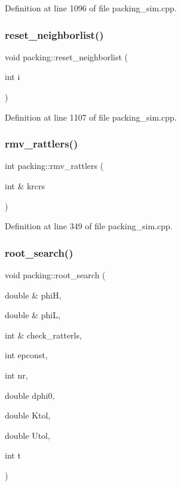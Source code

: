 Definition at line 1096 of file packing\+\_\+sim.\+cpp.

\mbox{\label{classpacking_a9c073e15bbafc308692fb63f6390a843}} 
\subsubsection{\texorpdfstring{reset\+\_\+neighborlist()}{reset\_neighborlist()}}
{\footnotesize\ttfamily void packing\+::reset\+\_\+neighborlist (\begin{DoxyParamCaption}\item[{int}]{i }\end{DoxyParamCaption})}



Definition at line 1107 of file packing\+\_\+sim.\+cpp.

\mbox{\label{classpacking_a6c94dc46459e4acd96bc99d43ed257b2}} 
\subsubsection{\texorpdfstring{rmv\+\_\+rattlers()}{rmv\_rattlers()}}
{\footnotesize\ttfamily int packing\+::rmv\+\_\+rattlers (\begin{DoxyParamCaption}\item[{int \&}]{krcrs }\end{DoxyParamCaption})}



Definition at line 349 of file packing\+\_\+sim.\+cpp.

\mbox{\label{classpacking_a7560d84cdb496db31c6314c3a82b10e0}} 
\subsubsection{\texorpdfstring{root\+\_\+search()}{root\_search()}}
{\footnotesize\ttfamily void packing\+::root\+\_\+search (\begin{DoxyParamCaption}\item[{double \&}]{phiH,  }\item[{double \&}]{phiL,  }\item[{int \&}]{check\+\_\+ratterls,  }\item[{int}]{epconst,  }\item[{int}]{nr,  }\item[{double}]{dphi0,  }\item[{double}]{Ktol,  }\item[{double}]{Utol,  }\item[{int}]{t }\end{DoxyParamCaption})}




